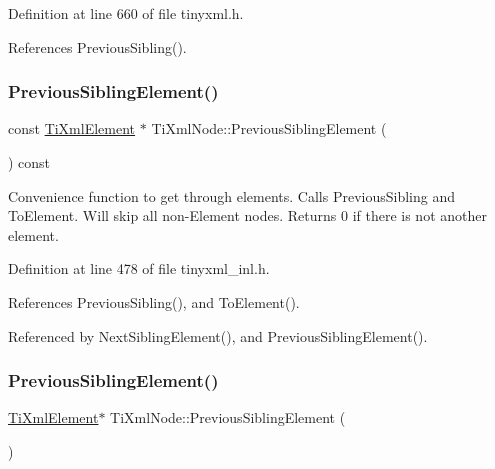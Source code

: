 Definition at line 660 of file tinyxml.\+h.



References Previous\+Sibling().

\hypertarget{class_ti_xml_node_a410804c6987cc1fbdf3bc6d53a9360fd}{}\label{class_ti_xml_node_a410804c6987cc1fbdf3bc6d53a9360fd} 
\subsubsection{\texorpdfstring{Previous\+Sibling\+Element()}{PreviousSiblingElement()}\hspace{0.1cm}{\footnotesize\ttfamily [1/4]}}
{\footnotesize\ttfamily const \hyperlink{class_ti_xml_element}{Ti\+Xml\+Element} $\ast$ Ti\+Xml\+Node\+::\+Previous\+Sibling\+Element (\begin{DoxyParamCaption}{ }\end{DoxyParamCaption}) const}

Convenience function to get through elements. Calls Previous\+Sibling and To\+Element. Will skip all non-\/\+Element nodes. Returns 0 if there is not another element. 

Definition at line 478 of file tinyxml\+\_\+inl.\+h.



References Previous\+Sibling(), and To\+Element().



Referenced by Next\+Sibling\+Element(), and Previous\+Sibling\+Element().

\hypertarget{class_ti_xml_node_a9f7092efa127c3190df5cf3cb97e887d}{}\label{class_ti_xml_node_a9f7092efa127c3190df5cf3cb97e887d} 
\subsubsection{\texorpdfstring{Previous\+Sibling\+Element()}{PreviousSiblingElement()}\hspace{0.1cm}{\footnotesize\ttfamily [2/4]}}
{\footnotesize\ttfamily \hyperlink{class_ti_xml_element}{Ti\+Xml\+Element}$\ast$ Ti\+Xml\+Node\+::\+Previous\+Sibling\+Element (\begin{DoxyParamCaption}{ }\end{DoxyParamCaption})\hspace{0.3cm}{\ttfamily [inline]}}



